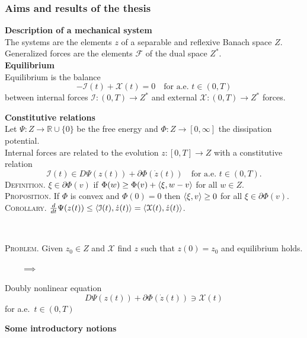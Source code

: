 \documentclass[8pt]{beamer}
\numberwithin{equation}{section}
\theoremstyle{definition}
\DeclarePairedDelimiter{\dual}{\langle}{\rangle}
\begin{document}
\begin{frame}
\frametitle{Aims and results of the thesis}
\centering
\begin{minipage}[c]{0.47\textwidth}
\textbf{Description of a mechanical system}
\\[0.5em]
The systems are the elements $z$ of a separable and reflexive Banach space $Z$.
\\[0.5em]
Generalized forces are the elements $\mathcal{F}$ of the dual space $Z^*$.
\\[1em]
\textbf{Equilibrium}
\\[0.5em]
Equilibrium is the balance
\[
-\mathcal{I}(t)+\mathcal{X}(t)=0\quad\text{for a.e.\ $t\in(0,T)$}
\]
between internal forces $\mathcal{I}\colon(0,T)\to Z^*$ and external $\mathcal{X}\colon(0,T)\to Z^*$ forces.
\end{minipage}
\hspace{0.02\textwidth}
\begin{minipage}[c]{0.47\textwidth}
\textbf{Constitutive relations}
\\[0.5em]
Let $\Psi\colon Z\to\mathbb{R}\cup\{0\}$ be the free energy and $\Phi\colon Z\to[0,\infty]$ the dissipation potential.
\\[0.5em]
Internal forces are related to the evolution $z\colon[0,T]\to Z$ with a constitutive relation
\[
\mathcal{I}(t)\in D\Psi(z(t))+\partial\Phi(\dot z(t))\quad\text{for a.e.\ $t\in(0,T)$}.
\]
\textsc{Definition.} $\xi\in\partial\Phi(v)$ if $\Phi(w)\ge\Phi(v)+\dual{\xi,w-v}$ for all $w\in Z$.
\\[0.5em]
\textsc{Proposition.} If $\Phi$ is convex and $\Phi(0)=0$ then $\dual{\xi,v}\ge0$ for all $\xi\in\partial\Phi(v)$.
\\[0.5em]
\textsc{Corollary.} $\frac{d}{dt}\Psi(z(t))\le\dual{\mathcal{I}(t),\dot z(t)}=\dual{\mathcal{X}(t),\dot z(t)}$.
\end{minipage}
\\[2em]
\begin{minipage}[c]{0.4\textwidth}
\textsc{Problem.} Given $z_0\in Z$ and $\mathcal{X}$ find $z$ such that $z(0)=z_0$ and equilibrium holds.
\end{minipage}
$\qquad\implies\qquad$
\begin{minipage}[c]{0.4\textwidth}
Doubly nonlinear equation
\[
D\Psi(z(t))+\partial\Phi(\dot z(t))\ni\mathcal{X}(t)
\]
for a.e.\ $t\in(0,T)$
\end{minipage}
\end{frame}

\begin{frame}
\centering
\large\textbf{Some introductory notions}
\end{frame}
\end{document}
